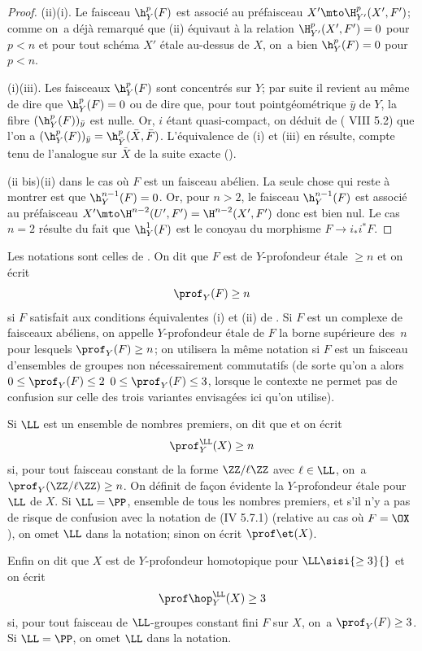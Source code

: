\begin{proof}
\textup{(ii)}\ALORS \textup{(i)}. Le faisceau ${\h}_Y^p(F)$ est associ\'e au pr\'efaisceau $X'\mto \H_{Y'}^p(X', F')$; comme on~a d\'ej\`a remarqu\'e que \textup{(ii)} \'equivaut \`a la relation $\H_{Y'}^p(X', F')=0$ pour $p<n$ et pour tout sch\'ema $X'$ \'etale au-dessus de $X$, on~a bien ${\h}_Y^p(F)=0$ pour $p<n$.

\textup{(i)}\SSI \textup{(iii)}. Les faisceaux ${\h}_Y^p(F)$ sont concentr\'es sur $Y$; par suite il revient au m\^eme de dire que ${\h}_Y^p(F)=0$ ou de dire que, pour tout point\pageoriginale g\'eom\'etrique $\bar y$ de $Y$, la fibre $({\h}_Y^p(F))_{\bar y}$ est nulle. Or, $i$ \'etant quasi-compact, on d\'eduit de ( VIII 5.2) que l'on a $({\h}_Y^p(F))_{\bar y}={\h}_{\bar Y}^p(\bar X, \bar F)$. L'\'equivalence de \textup{(i)} et \textup{(iii)} en r\'esulte, compte tenu de l'analogue sur $\bar X$ de la suite exacte ().

(ii bis)\ALORS \textup{(ii)} dans le cas o\`u $F$ est un faisceau ab\'elien. La seule chose qui reste \`a montrer est que ${\h}_Y^{n-1}(F)=0$. Or, pour $n>2$, le faisceau ${\h}_Y^{n-1}(F)$ est associ\'e au pr\'efaisceau $X'\mto \H^{n-2}(U', F')=\H^{n-2}(X', F')$ donc est bien nul. Le cas $n=2$ r\'esulte du fait que ${\h}_Y^1(F)$ est le conoyau du morphisme $F\to i_*i^*F$.
\skipqed
\end{proof}

\begin{definition} \label{XIV.1.2}
Les notations sont celles de . On dit que $F$ est de $Y$-profondeur \'etale $\geq n$ et on \'ecrit
$$
\prof_Y(F)\geq n$$
si $F$ satisfait aux conditions \'equivalentes \textup{(i)} et \textup{(ii)} de . Si $F$ est un complexe de faisceaux ab\'eliens, on appelle $Y$-profondeur \'etale de $F$ la borne sup\'erieure des~$n$ pour lesquels $\prof_Y(F)\geq n$; on utilisera la m\^eme notation si $F$ est un faisceau d'ensembles \resp de groupes non n\'ecessairement commutatifs (de sorte qu'on a alors $0\leq \prof_Y(F)\leq 2$\sisi{}{,} \resp $0\leq \prof_Y(F)\leq 3$, lorsque le contexte ne permet pas de confusion sur celle des trois variantes envisag\'ees ici qu'on utilise).

Si $\LL$ est un ensemble de nombres premiers, on dit que  et on \'ecrit
$$
\prof_Y^{\LL}(X)\geq n
$$
si, pour tout faisceau constant de la forme $\ZZ/\ell\ZZ$ avec $\ell\in \LL$, on~a $\prof_Y(\ZZ/\ell\ZZ)\geq n$\pageoriginale. On d\'efinit de fa\c con \'evidente la $Y$-profondeur \'etale pour $\LL$ de $X$. Si $\LL=\PP$, ensemble de tous les nombres premiers, et s'il n'y a pas de risque de confusion avec la notation de \textup{(\EGA IV 5.7.1)} (relative au cas o\`u $F=\OX$), on omet $\LL$ dans la notation; sinon on \'ecrit $\prof \et(X)$.

Enfin on dit que $X$ est de $Y$-profondeur homotopique  pour $\LL \sisi{\geq 3}{}$ et on \'ecrit
$$
\prof \hop_Y^{\LL}(X)\geq 3$$
si, pour tout faisceau de $\LL$-groupes constant fini $F$ sur $X$, on~a $\prof_Y(F)\geq 3$. Si $\LL=\PP$, on omet $\LL$ dans la notation.
\end{definition}

